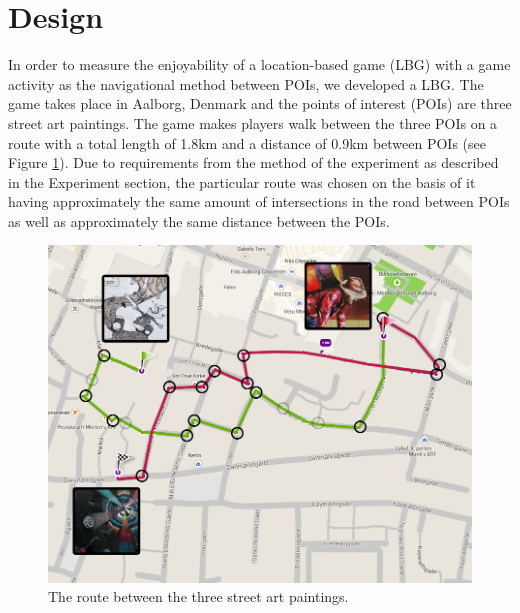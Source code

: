 \section{Design}
In order to measure the enjoyability of a location-based game (LBG) with a game activity as the navigational method between POIs, we developed a LBG. The game takes place in Aalborg, Denmark and the points of interest (POIs) are three street art paintings\cite{streetart}. The game makes players walk between the three POIs on a route with a total length of 1.8km and a distance of 0.9km between POIs (see Figure \ref{FinalRoute}). Due to requirements from the method of the experiment as described in the Experiment section, the particular route was chosen on the basis of it having approximately the same amount of intersections in the road between POIs as well as approximately the same distance between the POIs.

\begin{figure}[hbtp]
\centering
\includegraphics[scale=0.2]{Pics/FinalRoute.png}
\caption{The route between the three street art paintings.}
\label{FinalRoute}
\end{figure}

